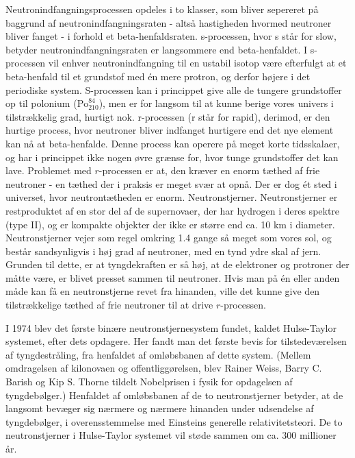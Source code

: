 \documentclass[twocolumn]{article}
\begin{document}
Neutronindfangningsprocessen opdeles i to klasser, som bliver sepereret på baggrund af neutronindfangningsraten - altså hastigheden hvormed neutroner bliver fanget - i forhold et beta-henfaldsraten. s-processen, hvor s står for slow, betyder neutronindfangningsraten er langsommere end beta-henfaldet. I s-processen vil enhver neutronindfangning til en ustabil isotop være efterfulgt at et beta-henfald til et grundstof med én mere protron, og derfor højere i det periodiske system. S-processen kan i princippet give alle de tungere grundstoffer op til polonium ($\mathrm{Po}_{210}^{84}$), men er for langsom til at kunne berige vores univers i tilstrækkelig grad, hurtigt nok. r-processen (r står for rapid), derimod, er den hurtige process, hvor neutroner bliver indfanget hurtigere end det nye element kan nå at beta-henfalde. Denne process kan operere på meget korte tidsskalaer, og har i princippet ikke nogen øvre grænse for, hvor tunge grundstoffer det kan lave. Problemet med $r$-processen er at, den kræver en enorm tæthed af frie neutroner - en tæthed der i praksis er meget svær at opnå. Der er dog ét sted i universet, hvor neutrontætheden er enorm. Neutronstjerner. Neutronstjerner er restproduktet af en stor del af de supernovaer, der har hydrogen i deres spektre (type II), og er kompakte objekter der ikke er større end ca. 10 km i diameter. Neutronstjerner vejer som regel omkring 1.4 gange så meget som vores sol, og består sandsynligvis i høj grad af neutroner, med en tynd ydre skal af jern. Grunden til dette, er at tyngdekraften er så høj, at de elektroner og protroner der måtte være, er blivet presset sammen til neutroner. Hvis man på én eller anden måde kan få en neutronstjerne revet fra hinanden, ville det kunne give den tilstrækkelige tæthed af frie neutroner til at drive $r$-processen.

I 1974 blev det første binære neutronstjernesystem fundet, kaldet Hulse-Taylor systemet, efter dets opdagere. Her fandt man det første bevis for tilstedeværelsen af tyngdestråling, fra henfaldet af omløbsbanen af dette system. (Mellem omdragelsen af kilonovaen og offentliggørelsen, blev Rainer Weiss, Barry C. Barish og Kip S. Thorne tildelt Nobelprisen i fysik for opdagelsen af tyngdebølger.) Henfaldet af omløbsbanen af de to neutronstjerner betyder, at de langsomt bevæger sig nærmere og nærmere hinanden under udsendelse af tyngdebølger, i overensstemmelse med Einsteins generelle relativitetsteori. De to neutronstjerner i Hulse-Taylor systemet vil støde sammen om ca. 300 millioner år.  
\end{document}
